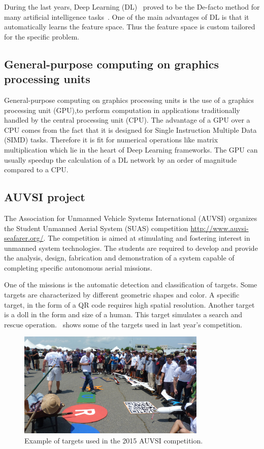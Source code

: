 \documentclass[a4paper]{article} %
\begin{document}
During the last years, Deep Learning (DL)~\cite{Bengio2009, LeCun2015} proved to
be the De-facto method for many artificial intelligence
tasks~\cite{hadsell2009learning, eigen2014depth, ross2013learning}. One of the
main advantages of DL is that it automatically learns the feature space. Thus
the feature space is custom tailored for the specific problem.

\subsection{General-purpose computing on graphics processing units}

General-purpose computing on graphics processing units is the use of a graphics
processing unit (GPU),to perform computation in applications traditionally
handled by the central processing unit (CPU). The advantage of a GPU over a CPU
comes from the fact that it is designed for Single Instruction Multiple Data
(SIMD) tasks. Therefore it is fit for numerical operations like matrix
multiplication which lie in the heart of Deep Learning frameworks. The GPU can
usually speedup the calculation of a DL network by an order of magnitude
compared to a CPU.

\subsection{AUVSI project}

The Association for Unmanned Vehicle Systems International (AUVSI) organizes the
Student Unmanned Aerial System (SUAS) competition
\url{http://www.auvsi-seafarer.org/}. The competition is aimed  at stimulating
and fostering interest in unmanned system technologies. The  students  are
required  to  develop  and  provide  the  analysis, design, fabrication and
demonstration of a system capable of completing specific autonomous aerial
missions.

One of the missions is the automatic detection and classification of targets.
Some targets are characterized by different geometric shapes and color. A specific
target, in the form of a QR code requires high spatial resolution. Another
target is a doll in the form and size of a human. This target simulates a search
and rescue operation.~ shows some of the targets used in last
year's competition.
\begin{figure}[h]
	\centering
	\includegraphics[width=0.8\textwidth]{auvsi_targets}
	\caption{Example of targets used in the 2015 AUVSI competition.}
	\label{fig:targets}
\end{figure}
\end{document}

